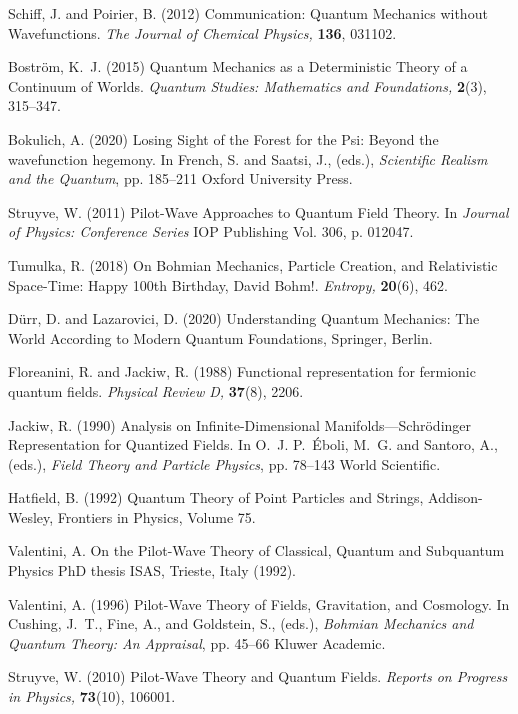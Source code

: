 \documentclass[12pt,onecolumn,secnumarabic,amsmath,amssymb,balancelastpage,nofootinbib]{article}
\begin{document}
\begin{thebibliography}{100}
Schiff, J. and Poirier, B. (2012)
Communication: Quantum Mechanics without Wavefunctions.
{\em The Journal of Chemical Physics,} {\bf 136}, 031102.

Bostr{\"o}m, K.~J. (2015)
Quantum Mechanics as a Deterministic Theory of a Continuum of Worlds.
{\em Quantum Studies: Mathematics and Foundations,} {\bf 2}(3), 315--347.

Bokulich, A. (2020)
Losing Sight of the Forest for the Psi: Beyond the wavefunction hegemony.
In French, S. and Saatsi, J., (eds.), \emph{Scientific Realism and the
  Quantum},  pp. 185--211 Oxford University Press.

Struyve, W. (2011)
Pilot-Wave Approaches to Quantum Field Theory.
In \emph{Journal of Physics: Conference Series} IOP Publishing
Vol. 306,  p. 012047.

Tumulka, R. (2018)
On Bohmian Mechanics, Particle Creation, and Relativistic Space-Time: Happy
  100th Birthday, David Bohm!.
{\em Entropy,} {\bf 20}(6), 462.

D\"{u}rr, D. and Lazarovici, D. (2020)
Understanding Quantum Mechanics: The World According to Modern Quantum
  Foundations,
Springer, Berlin.

Floreanini, R. and Jackiw, R. (1988)
Functional representation for fermionic quantum fields.
{\em Physical Review D,} {\bf 37}(8), 2206.

Jackiw, R. (1990)
Analysis on Infinite-Dimensional Manifolds---Schr\"{o}dinger Representation for
  Quantized Fields.
In O.~J. P.~\'{E}boli, M.~G. and Santoro, A., (eds.), \emph{Field Theory and
  Particle Physics},  pp. 78--143 World Scientific.

Hatfield, B. (1992)
Quantum Theory of Point Particles and Strings,
Addison-Wesley,
Frontiers in Physics, Volume 75.

Valentini, A.
On the Pilot-Wave Theory of Classical, Quantum and Subquantum Physics
PhD thesis ISAS, Trieste, Italy (1992).

Valentini, A. (1996)
Pilot-Wave Theory of Fields, Gravitation, and Cosmology.
In Cushing, J.~T., Fine, A., and Goldstein, S., (eds.), \emph{Bohmian Mechanics
  and Quantum Theory: An Appraisal},  pp. 45--66 Kluwer Academic.

Struyve, W. (2010)
Pilot-Wave Theory and Quantum Fields.
{\em Reports on Progress in Physics,} {\bf 73}(10), 106001.


\end{thebibliography}
\end{document}
